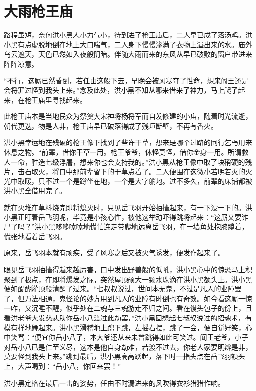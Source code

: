\chapter{大雨枪王庙}
\label{chap:da-yu-qiang-wang-miao}


路程虽短，奈何洪小黑人小力气小，待到进了枪王庙后，二人早已成了落汤鸡。洪小黑有点虚脱地倒在地上大口喘气，二人身下慢慢渗满了衣物上溢出来的水。庙外乌云遮天，天色已然如入夜般阴暗。伴随大雨而来的东风从早已破败的窗户带进来阵阵凉意。

“不行，这厮已然昏倒，若任由这般下去，早晚会被风寒夺了性命，想来阎王还是会将罪过怪到我头上来。”念及此处，洪小黑不知从哪来借来了神力，马上爬了起来，在枪王庙里寻找起来。

此枪王庙本是当地民众为祭奠大宋神将杨将军而自发修建的小庙，随着时光流逝，朝代更迭，物是人非，枪王庙早已破落得成了残垣断壁，不再有香火。

洪小黑幸运地在残破的枪王像下找到了些许干草，想来是哪个过路的同行乞丐用来休息之物。“前辈，借你干草一用。枪王爷爷，休怪莫怪，借你金身一用。所谓救人一命，胜造七级浮屠，想来你也会支持我的。”洪小黑从枪王像中取了块稍硬的残片，击石取火，将口中那前辈留下的干草点着了。二人便围在这微小若明若灭的火光中取暖，只不过一个是蹲坐在地，一个是大字躺地。过不多久，前辈的床铺都被洪小黑全借用完了。

就在火堆在草料烧完即将熄灭时，只见岳飞羽开始抽搐起来，有一下没一下的。洪小黑正盯着岳飞羽呢，毕竟是小孩心性，被他这举动吓得跳将起来：“这厮又要诈尸了吗？”洪小黑哆哆嗦嗦地慌忙连走带爬地远离岳飞羽，在一墙角处抱膝蹲着，慌张地看着岳飞羽。

原来，岳飞羽本就有顽疾，受了风寒之后又被火气诱发，便发作起来了。

眼见岳飞羽抽搐得越来越厉害，口中发出野兽般的低吼，洪小黑心中的惊恐马上积聚到了极点，在即将爆发之际，突然屋顶硕大一颗水珠滴在洪小黑额头上。洪小黑便如醍醐灌顶般清醒了过来。“七叔叔说过，世间本无鬼，不过是凡人的业障罢了，但万法相通，鬼怪论的妙方用到凡人的业障有时倒也有奇效。如今看这厮一惊一咋，又沉睡不醒，似乎处在二魂与三魂游走不归之间。看在馒头包子的份上，且看洪老爷大发慈悲助你岳小八渡过此劫罢，”洪小黑回想起七叔叔说过的招魂术，有模有样地舞起来。洪小黑滑稽地上蹿下跳，左摇右摆，跳了一会，便自觉好笑，心中笑骂：“便宜你岳小八了，本大爷还从来未曾跳得如此可笑过。阎王老爷，小子对岳小八已是仁至义尽，这本是他自身劫难，若渡不过去，你老人家要明辨是非，莫要怪到我头上来。”跳到最后，洪小黑高高跃起，落下时一指头点在岳飞羽额头上，大声喝到：“岳小八，你回来罢！”

洪小黑定格在最后一击的姿势，任由不时漏进来的风吹得衣衫猎猎作响。

